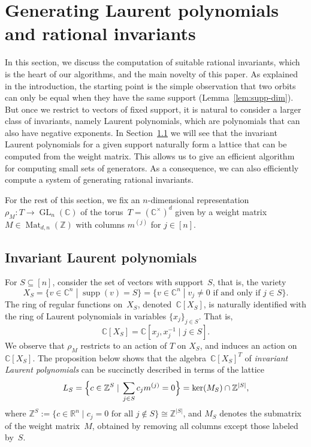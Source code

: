 \documentclass[10pt,a4paper]{article}
\DeclareMathOperator{\supp}{supp}
\DeclareMathOperator{\GL}{GL}
\DeclareMathOperator{\Mat}{Mat}
\theoremstyle{definition}
\numberwithin{equation}{section}
\newcommand{\CC}{\mathbb{C}}
\newcommand{\ZZ}{\mathbb{Z}}
\newcommand{\RR}{\mathbb{R}}
\begin{document}
\section{Generating Laurent polynomials and rational invariants}\label{sec:gen-inv}
%
In this section, we discuss the computation of suitable rational invariants, which is the heart of our algorithms, and the main novelty of this paper.
As explained in the introduction, the starting point is the simple observation that two orbits can only be equal when they have the same support (Lemma~\ref{lem:supp-dim}).
But once we restrict to vectors of fixed support, it is natural to consider a larger class of invariants, namely Laurent polynomials, which are polynomials that can also have negative exponents.
In Section~\ref{se:lattice} we will see that the invariant Laurent polynomials for a given support naturally form a lattice that can be computed from the weight matrix.
This allows us to give an efficient algorithm for computing small sets of generators.
As a consequence, we can also efficiently compute a system of generating rational invariants.

For the rest of this section, we fix an $n$-dimensional representation $\rho_M \colon T \rightarrow \GL_n(\CC)$ of the torus~$T=(\CC^\times)^d$ given by a weight matrix $M \in \Mat_{d,n}(\ZZ)$ with columns $m^{(j)}$ for $j\in[n]$.

%
\subsection{Invariant Laurent polynomials}\label{se:lattice}
%
For $S \subseteq [n]$, consider the set of vectors with support~$S$, that is, the variety
\begin{equation}\label{eq:XS}
  X_S = \{ v \in \CC^n \;|\; \supp(v) = S \} = \{ v \in \CC^n \;|\; v_j \neq 0 \text{ if and only if } j \in S \}.
\end{equation}
The ring of regular functions on~$X_S$, denoted~$\CC[X_S]$, is naturally identified with the ring of Laurent polynomials in variables $\{x_j\}_{j\in S}$.
That is,
\[
  \CC[X_S] = \CC[x_j, x_j^{-1} \;|\; j \in S].
\]
We observe that $\rho_M$ restricts to an action of $T$ on $X_S$, and induces an action on $\CC[X_S]$.
The proposition below shows that the
algebra~$\CC[X_S]^T$ of \emph{invariant Laurent polynomials} can be succinctly described in terms of the lattice
\begin{equation}\label{def:L}
  L_S = \Bigl\{ c \in \ZZ^S \;|\; \sum_{j \in S} c_j m^{(j)} = 0 \Bigr\} = \ker(M_S) \cap \ZZ^{|S|},
\end{equation}
where $\ZZ^S := \{ c \in \RR^n \;|\; c_j = 0 \text{ for all } j \not\in S \} \cong \ZZ^{|S|}$, and $M_S$ denotes the submatrix of the weight matrix~$M$,
obtained by removing all columns except those labeled by~$S$.
%
\end{document}
